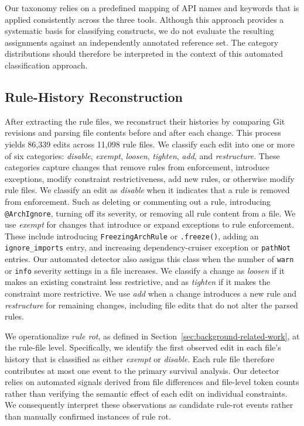 Our taxonomy relies on a predefined mapping of API names 
and keywords that is applied consistently across the three 
tools. Although this approach provides a systematic basis 
for classifying constructs, we do not evaluate the 
resulting assignments against an independently annotated 
reference set. The category distributions should therefore 
be interpreted in the context of this automated 
classification approach.



\subsection{Rule-History Reconstruction}

After extracting the rule files, we reconstruct their 
histories by comparing Git revisions and parsing file 
contents before and after each change. This process 
yields 86,339 edits across 11,098 rule files. We 
classify each edit into one or more of six categories: 
\emph{disable}, \emph{exempt}, \emph{loosen}, 
\emph{tighten}, \emph{add}, and \emph{restructure}. 
These categories capture changes that remove rules 
from enforcement, introduce exceptions, modify 
constraint restrictiveness, add new rules, or 
otherwise modify rule files. We classify an edit as \emph{disable} when it indicates that 
a rule is removed from enforcement. Such as deleting or commenting
out a rule, introducing \texttt{@ArchIgnore}, turning off its severity,
or removing all rule content from a file. We use \emph{exempt}
for changes that introduce or expand exceptions to rule
enforcement. These include introducing \texttt{FreezingArchRule}
or \texttt{.freeze()}, adding an \texttt{ignore\_imports} entry,
and increasing dependency-cruiser exception or \texttt{pathNot}
entries. Our automated detector also assigns this class when
the number of \texttt{warn} or \texttt{info} severity settings
in a file increases. We classify a change as \emph{loosen} 
if it makes an existing constraint less restrictive, 
and as \emph{tighten} if it makes the constraint more 
restrictive. We use \emph{add} when a change introduces a new rule and
\emph{restructure} for remaining changes, including file edits
that do not alter the parsed rules.

We operationalize \emph{rule rot}, as defined in
Section~\ref{sec:background-related-work}, at the rule-file
level. Specifically, we identify the first observed edit in
each file's history that is classified as either
\emph{exempt} or \emph{disable}. Each rule file therefore
contributes at most one event to the primary survival analysis.
Our detector relies on automated signals derived from file
differences and file-level token counts rather than verifying
the semantic effect of each edit on individual constraints.
We consequently interpret these observations as candidate
rule-rot events rather than manually confirmed instances
of rule rot.


